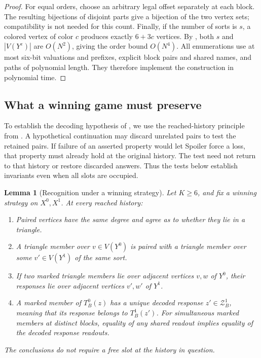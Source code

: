 \documentclass[11pt]{article}
\newtheorem{lemma}[theorem]{Lemma}
\theoremstyle{definition}
\begin{document}
\begin{proof}
For equal orders, choose an arbitrary legal offset separately at each
block.  The resulting bijections of disjoint parts give a bijection
of the two vertex sets; compatibility is not needed for this count.
Finally, if the number of sorts is \(s\), a colored vertex of color
\(c\) produces exactly \(6+3c\) vertices.
By , both \(s\) and \(\left\lvert{V(Y^\varepsilon)}\right\rvert\)
are \(O(N^2)\), giving the order bound \(O(N^4)\).
All enumerations use at most six-bit valuations and prefixes, explicit
block pairs and shared names, and paths of polynomial length.
They therefore implement the construction in polynomial time.
\end{proof}

\subsection{What a winning game must preserve}

To establish the decoding hypothesis of ,
we use the reached-history principle from .
A hypothetical continuation may discard unrelated pairs to test the
retained pairs. If failure of an asserted property would let Spoiler
force a loss, that property must already hold at the original history.
The test need not return to that history or restore discarded answers.
Thus the tests below establish invariants even when all slots are occupied.

\begin{lemma}[Recognition under a winning strategy]
\label{lem:graph-recognition}
Let \(K\ge6\), and fix a winning strategy on \(X^0,X^1\).
At every reached history:
\begin{enumerate}
\item
Paired vertices have the same degree and agree as to whether they lie
in a triangle.
\item
A triangle member over \(v\in V(Y^0)\) is paired with a triangle
member over some \(v'\in V(Y^1)\) of the same sort.
\item
If two marked triangle members lie over adjacent vertices \(v,w\)
of \(Y^0\), their responses lie over adjacent vertices \(v',w'\)
of \(Y^1\).
\item
A marked member of \(T_B^0(z)\) has a unique decoded response
\(z'\in\mathcal Z_B^1\), meaning that its response belongs to \(T_B^1(z')\).
For simultaneous marked members at distinct blocks, equality of any
shared readout implies equality of the decoded response readouts.
\end{enumerate}
The conclusions do not require a free slot at the history in question.
\end{lemma}
\end{document}
